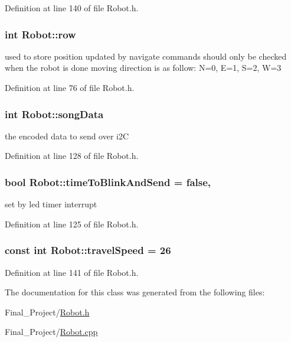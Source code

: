 Definition at line 140 of file Robot.\-h.

\hypertarget{classRobot_a35ce5c416a079fcf6b943843ec151d63}{
\subsubsection[{row}]{\setlength{\rightskip}{0pt plus 5cm}int Robot\-::row}}\label{classRobot_a35ce5c416a079fcf6b943843ec151d63}


used to store position updated by navigate commands should only be checked when the robot is done moving direction is as follow\-: N=0, E=1, S=2, W=3 



Definition at line 76 of file Robot.\-h.

\hypertarget{classRobot_a7818916adfa736ab4cb21011fe302cdb}{
\subsubsection[{song\-Data}]{\setlength{\rightskip}{0pt plus 5cm}int Robot\-::song\-Data\hspace{0.3cm}{\ttfamily [private]}}}\label{classRobot_a7818916adfa736ab4cb21011fe302cdb}


the encoded data to send over i2\-C 



Definition at line 128 of file Robot.\-h.

\hypertarget{classRobot_aa074884ad594acf20282805c811adaff}{
\subsubsection[{time\-To\-Blink\-And\-Send}]{\setlength{\rightskip}{0pt plus 5cm}bool Robot\-::time\-To\-Blink\-And\-Send = false\hspace{0.3cm}{\ttfamily [static]}, {\ttfamily [private]}}}\label{classRobot_aa074884ad594acf20282805c811adaff}


set by led timer interrupt 



Definition at line 125 of file Robot.\-h.

\hypertarget{classRobot_a87ec942d7d53b1a4b1c46422f6a134eb}{
\subsubsection[{travel\-Speed}]{\setlength{\rightskip}{0pt plus 5cm}const int Robot\-::travel\-Speed = 26\hspace{0.3cm}{\ttfamily [private]}}}\label{classRobot_a87ec942d7d53b1a4b1c46422f6a134eb}


Definition at line 141 of file Robot.\-h.



The documentation for this class was generated from the following files\-:\begin{DoxyCompactItemize}
\item 
Final\-\_\-\-Project/\hyperlink{Robot_8h}{Robot.\-h}\item 
Final\-\_\-\-Project/\hyperlink{Robot_8cpp}{Robot.\-cpp}\end{DoxyCompactItemize}
